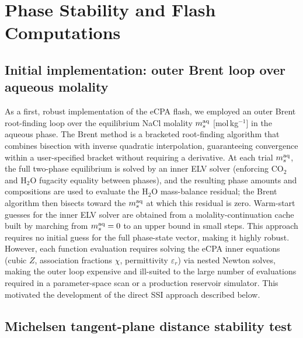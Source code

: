 \documentclass[preprint,12pt,authoryear]{elsarticle}
\begin{document}
\section{Phase Stability and Flash Computations}
\label{sec:flash}

\subsection{Initial implementation: outer Brent loop over aqueous molality}
\label{sec:brent}

As a first, robust implementation of the eCPA flash, we employed an outer Brent
root-finding loop over the equilibrium NaCl molality $m_s^{\rm aq}$ [mol\,kg$^{-1}$] in
the aqueous phase.
The Brent method \citep{Brent1973} is a bracketed root-finding algorithm that combines
bisection with inverse quadratic interpolation, guaranteeing convergence within a
user-specified bracket without requiring a derivative.
At each trial $m_s^{\rm aq}$, the full two-phase equilibrium is solved by an inner ELV
solver (enforcing CO$_2$ and H$_2$O fugacity equality between phases), and the
resulting phase amounts and compositions are used to evaluate the H$_2$O mass-balance
residual; the Brent algorithm then bisects toward the $m_s^{\rm aq}$ at which this
residual is zero.
Warm-start guesses for the inner ELV solver are obtained from a molality-continuation
cache built by marching from $m_s^{\rm aq}=0$ to an upper bound in small steps.
This approach requires no initial guess for the full phase-state vector, making it highly
robust.
However, each function evaluation requires solving the eCPA inner equations (cubic $Z$,
association fractions $\chi$, permittivity $\varepsilon_r$) via nested Newton solves,
making the outer loop expensive and ill-suited to the large number of evaluations required
in a parameter-space scan or a production reservoir simulator.
This motivated the development of the direct SSI approach described below.

\subsection{Michelsen tangent-plane distance stability test}
\label{sec:stability}
\end{document}
